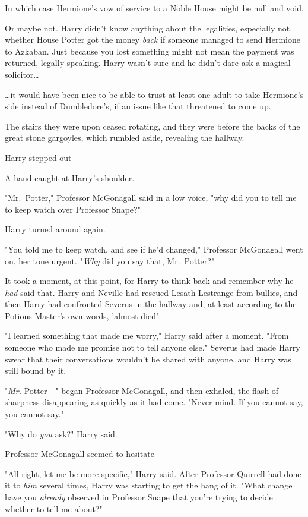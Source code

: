 In which case Hermione's vow of service to a Noble House might be null and void.

Or maybe not. Harry didn't know anything about the legalities, especially not 
whether House Potter got the money \emph{back} if someone managed to send 
Hermione to Azkaban. Just because you lost something might not mean the payment 
was returned, legally speaking. Harry wasn't sure and he didn't dare ask a 
magical solicitor{\ldots}

{\ldots}it would have been nice to be able to trust at least one adult to take 
Hermione's side instead of Dumbledore's, if an issue like that threatened to 
come up.

The stairs they were upon ceased rotating, and they were before the backs of 
the great stone gargoyles, which rumbled aside, revealing the hallway.

Harry stepped out---

A hand caught at Harry's shoulder.

"Mr.~Potter," Professor McGonagall said in a low voice, "why did you to tell me 
to keep watch over Professor Snape?"

Harry turned around again.

"You told me to keep watch, and see if he'd changed," Professor McGonagall went 
on, her tone urgent. "\emph{Why} did you say that, Mr.~Potter?"

It took a moment, at this point, for Harry to think back and remember why he 
\emph{had} said that. Harry and Neville had rescued Lesath Lestrange from 
bullies, and then Harry had confronted Severus in the hallway and, at least 
according to the Potions Master's own words, 'almost died'---

"I learned something that made me worry," Harry said after a moment. "From 
someone who made me promise not to tell anyone else." Severus had made Harry 
swear that their conversations wouldn't be shared with anyone, and Harry was 
still bound by it.

"\emph{Mr.} Potter---" began Professor McGonagall, and then exhaled, the flash 
of sharpness disappearing as quickly as it had come. "Never mind. If you cannot 
say, you cannot say."

"Why do \emph{you} ask?" Harry said.

Professor McGonagall seemed to hesitate---

"All right, let me be more specific," Harry said. After Professor Quirrell had 
done it to \emph{him} several times, Harry was starting to get the hang of it. 
"What change have you \emph{already} observed in Professor Snape that you're 
trying to decide whether to tell me about?"

